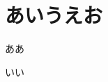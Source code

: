 \documentclass[head_space=20mm,foot_space=20mm,gutter=10mm,line_length=190mm]{jlreq}
\begin{document}
\maketitle


\tableofcontents %


\clearpage
\section{あいうえお}

\clearpage
\begin{thebibliography}{99}
\item ああ
\item いい
\end{thebibliography}
\end{document}
